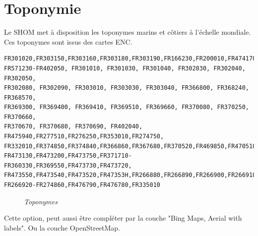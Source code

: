 \section{Toponymie}
Le SHOM met à disposition les toponymes marins et côtiers à l'échelle mondiale. Ces toponymes sont issus des cartes ENC.
{\small
\begin{verbatim}
FR301020,FR303150,FR303160,FR303180,FR303190,FR166230,FR200010,FR474170,FR270140,
FR571230-FR402050, FR301010, FR301030, FR301040, FR302030, FR302040, FR302050, 
FR302080, FR302090, FR303010, FR303030, FR303040, FR366800, FR368240, FR368570, 
FR369300, FR369400, FR369410, FR369510, FR369660, FR370080, FR370250, FR370660,
FR370670, FR370680, FR370690, FR402040, FR475940,FR277510,FR276250,FR353010,FR274750,
FR332010,FR374850,FR374840,FR366860,FR367680,FR370520,FR469850,FR470510,
FR473130,FR473200,FR473750,FR371710-FR360330,FR369550,FR473730,FR473720,
FR473550,FR473540,FR473520,FR47353H,FR266880,FR266890,FR266900,FR266910,
FR266920-FR274860,FR476790,FR476780,FR335010
\end{verbatim}
}
\begin{center}
\begin{figure}[ht]
\caption{\label{toponymes}\textit{Toponymes}}
\end{figure}
\end{center}
Cette option, peut aussi être compléter par la couche "Bing Maps, Aerial with labels". Ou la couche OpenStreetMap.
